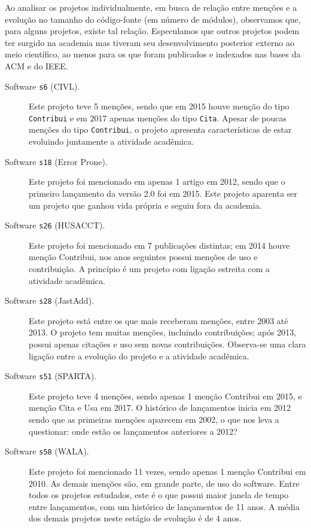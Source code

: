 Ao analisar os projetos individualmente, em busca de relação entre
menções e a evolução no tamanho do código-fonte (em número de módulos), 
observamos que, para alguns projetos, existe tal relação.
Especulamos que outros projetos podem ter surgido na academia mas 
tiveram seu desenvolvimento posterior externo ao meio científico, 
ao menos para os que foram publicados e indexados nas bases da ACM e do IEEE.

\begin{description}

  \item[Software \texttt{s6} (CIVL).]
    Este projeto teve 5 menções, sendo que em 2015 houve menção do tipo \texttt{Contribui} 
    e em 2017 apenas menções do tipo \texttt{Cita}. 
    Apesar de poucas menções do tipo \texttt{Contribui},
    o projeto apresenta características de estar evoluindo juntamente a atividade
    acadêmica.

  \item[Software \texttt{s18} (Error Prone).]
    Este projeto foi mencionado em apenas 1 artigo em 2012, sendo que o
    primeiro lançamento da versão 2.0 foi em 2015. Este projeto aparenta ser um
    projeto que ganhou vida própria e seguiu fora da academia.

  \item[Software \texttt{s26} (HUSACCT).]
    Este projeto foi mencionado em 7 publicações distintas; em 2014 houve
    menção Contribui, nos anos seguintes possui menções de uso e contribuição.
    A princípio é um projeto com ligação estreita com a atividade acadêmica.

  \item[Software \texttt{s28} (JastAdd).]
    Este projeto está entre os que mais receberam menções, entre 2003 até 2013.
    O projeto tem muitas menções, incluindo contribuições; após 2013, possui apenas
    citações e uso sem novas contribuições. Observa-se uma clara ligação
    entre a evolução do projeto e a atividade acadêmica.

  \item[Software \texttt{s51} (SPARTA).]
    Este projeto teve 4 menções, sendo apenas 1 menção Contribui em 2015,
    e menção Cita e Usa em 2017. O histórico de lançamentos inicia em 2012
    sendo que as primeiras menções aparecem em 2002, o que nos leva a
    questionar: onde estão os lançamentos anteriores a 2012?

  \item[Software \texttt{s58} (WALA).]
    Este projeto foi mencionado 11 vezes, sendo apenas 1 menção Contribui em 2010.
    As demais menções são, em grande parte, de uso do software. 
    Entre todos os projetos estudados, este é o que possui maior janela de tempo entre lançamentos, 
    com um histórico de lançamentos de 11 anos. A média dos demais  projetos neste estágio de evolução
    é de 4 anos.

\end{description}

